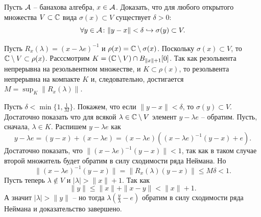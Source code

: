 \begin{task}[T4]
    Пусть $\mathcal{A}$ -- банахова алгебра, $x \in \mathcal{A}$.
    Доказать, что для любого открытого множества $V \subset \mathbb{C}$ вида $\sigma(x) \subset V$ существует $\delta > 0\colon$
    \[
        \forall y \in \mathcal{A}\colon \|y - x\| < \delta \hookrightarrow \sigma(y) \subset V.
    \]
\end{task}
\begin{solution}
    Пусть $R_x(\lambda) = (x - \lambda e)^{-1}$ и $\rho(x) = \mathbb{C} \setminus \sigma(x)$.
    Поскольку $\sigma(x) \subset V$, то $\mathbb{C} \setminus V \subset \rho(x)$.
    Расссмотрим $K = (\mathbb{C} \setminus V) \cap B_{\|x\| + 1}[0]$.
    Так как резольвента непрерывна на резольвентном множестве, и $K \subset \rho(x)$, то резольвента непрерывна на компакте $K$ и, следовательно, достигается $M = \sup_{K}\|R_x(\lambda)\|$.
    
    Пусть $\delta < \min\{1, \frac{1}{M}\}$.
    Покажем, что если $\|y - x\| < \delta$, то $\sigma(y) \subset V$.
    Достаточно показать что для всякой $\lambda \in \mathbb{C} \setminus V$ элемент $y - \lambda e$ -- обратим.
    Пусть, сначала, $\lambda \in K$.
    Распишем $y - \lambda e$ как
    \[
        y - \lambda e = (y - x) + (x - \lambda e) = (x - \lambda e)((x - \lambda e)^{-1}(y - x) + e).
    \]
    Достаточно показать, что $\|(x - \lambda e)^{-1}(y - x)\| < 1$, так как в таком случае второй множитель будет обратим в силу сходимости ряда Неймана.
    Но
    \[
        \|(x - \lambda e)^{-1}(y - x)\| = \|R_x(\lambda)(y - x)\| \leq M\delta < 1.
    \]
    Пусть теперь $\lambda \notin V$ и $|\lambda| > \|x\| + 1$.
    Так как
    \[
        \|y\| \leq \|x\| + \|x - y\| < \|x\| + 1.
    \]
    А значит $|\lambda| > \|y\|$ -- но тогда $\lambda\left(\frac{y}{\lambda} - e\right)$ обратим в силу сходимости ряда Неймана и доказательство завершено.
\end{solution}
